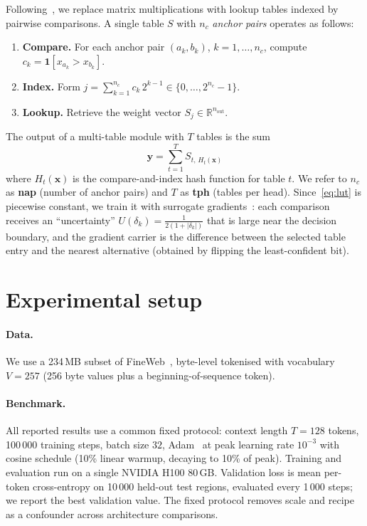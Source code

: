 \documentclass[11pt]{article}
\begin{document}
Following~\cite{ref:manifesto}, we replace matrix multiplications with lookup tables indexed by pairwise comparisons.
A single table $S$ with $n_c$ \emph{anchor pairs} operates as follows:
\begin{enumerate}
    \item \textbf{Compare.} For each anchor pair $(a_k, b_k)$, $k = 1, \ldots, n_c$, compute $c_k = \mathbf{1}[x_{a_k} > x_{b_k}]$.
    \item \textbf{Index.} Form $j = \sum_{k=1}^{n_c} c_k \, 2^{k-1} \in \{0, \ldots, 2^{n_c} - 1\}$.
    \item \textbf{Lookup.} Retrieve the weight vector $S_j \in \mathbb{R}^{n_\mathrm{out}}$.
\end{enumerate}
The output of a multi-table module with $T$ tables is the sum
\begin{equation}
    \mathbf{y} = \sum_{t=1}^{T} S_{t,\,H_t(\mathbf{x})}
    \label{eq:lut}
\end{equation}
where $H_t(\mathbf{x})$ is the compare-and-index hash function for table $t$.
We refer to $n_c$ as \textbf{nap} (number of anchor pairs) and $T$ as \textbf{tph} (tables per head).
Since~\eqref{eq:lut} is piecewise constant, we train it with surrogate gradients~\cite{ref:manifesto}: each comparison receives an ``uncertainty'' $U(\delta_k) = \tfrac{1}{2(1+|\delta_k|)}$ that is large near the decision boundary, and the gradient carrier is the difference between the selected table entry and the nearest alternative (obtained by flipping the least-confident bit).


\section{Experimental setup}
\label{sec:setup}

\paragraph{Data.}
We use a 234\,MB subset of FineWeb~\cite{ref:fineweb}, byte-level tokenised with vocabulary $V = 257$ (256 byte values plus a beginning-of-sequence token).

\paragraph{Benchmark.}
All reported results use a common fixed protocol: context length $T = 128$ tokens, 100\,000 training steps, batch size $32$, Adam~\cite{ref:adam} at peak learning rate $10^{-3}$ with cosine schedule (10\% linear warmup, decaying to 10\% of peak).
Training and evaluation run on a single NVIDIA H100 80\,GB.
Validation loss is mean per-token cross-entropy on 10\,000 held-out test regions, evaluated every 1\,000 steps; we report the best validation value.
The fixed protocol removes scale and recipe as a confounder across architecture comparisons.
\end{document}
